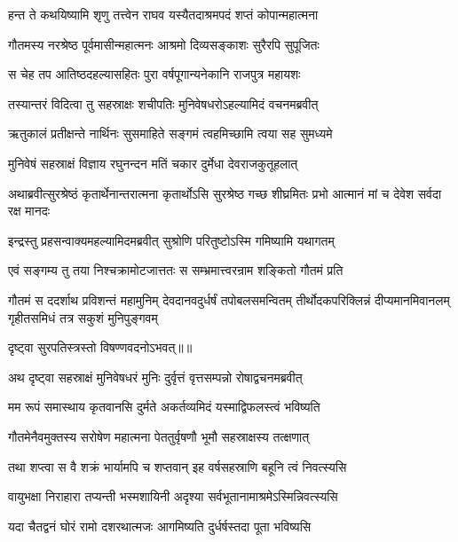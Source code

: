 \twolineshloka
{हन्त ते कथयिष्यामि शृणु तत्त्वेन राघव}
{यस्यैतदाश्रमपदं शप्तं कोपान्महात्मना} %

\twolineshloka
{गौतमस्य नरश्रेष्ठ पूर्वमासीन्महात्मनः}
{आश्रमो दिव्यसङ्काशः सुरैरपि सुपूजितः} %

\twolineshloka
{स चेह तप आतिष्ठदहल्यासहितः पुरा}
{वर्षपूगान्यनेकानि राजपुत्र महायशः} %

\twolineshloka
{तस्यान्तरं विदित्वा तु सहस्राक्षः शचीपतिः}
{मुनिवेषधरोऽहल्यामिदं वचनमब्रवीत्} %

\twolineshloka
{ऋतुकालं प्रतीक्षन्ते नार्थिनः सुसमाहिते}
{सङ्गमं त्वहमिच्छामि त्वया सह सुमध्यमे} %

\twolineshloka
{मुनिवेषं सहस्राक्षं विज्ञाय रघुनन्दन}
{मतिं चकार दुर्मेधा देवराजकुतूहलात्} %

\threelineshloka
{अथाब्रवीत्सुरश्रेष्ठं कृतार्थेनान्तरात्मना}
{कृतार्थोऽसि सुरश्रेष्ठ गच्छ शीघ्रमितः प्रभो}
{आत्मानं मां च देवेश सर्वदा रक्ष मानदः} %

\twolineshloka
{इन्द्रस्तु प्रहसन्वाक्यमहल्यामिदमब्रवीत्}
{सुश्रोणि परितुष्टोऽस्मि गमिष्यामि यथागतम्} %

\twolineshloka
{एवं सङ्गम्य तु तया निश्चक्रामोटजात्ततः}
{स सम्भ्रमात्त्वरन्राम शङ्कितो गौतमं प्रति} %

\fourlineshloka
{गौतमं स ददर्शाथ प्रविशन्तं महामुनिम्}
{देवदानवदुर्धर्षं तपोबलसमन्वितम्}
{तीर्थोदकपरिक्लिन्नं दीप्यमानमिवानलम्}
{गृहीतसमिधं तत्र सकुशं मुनिपुङ्गवम्} %

{दृष्ट्वा सुरपतिस्त्रस्तो विषण्णवदनोऽभवत्॥॥} %

\addtocounter{shlokacount}{1}

\twolineshloka
{अथ दृष्ट्वा सहस्राक्षं मुनिवेषधरं मुनिः}
{दुर्वृत्तं वृत्तसम्पन्नो रोषाद्वचनमब्रवीत्} %

\twolineshloka
{मम रूपं समास्थाय कृतवानसि दुर्मते}
{अकर्तव्यमिदं यस्माद्विफलस्त्वं भविष्यति} %

\twolineshloka
{गौतमेनैवमुक्तस्य सरोषेण महात्मना}
{पेततुर्वृषणौ भूमौ सहस्राक्षस्य तत्क्षणात्} %

\twolineshloka
{तथा शप्त्वा स वै शक्रं भार्यामपि च शप्तवान्}
{इह वर्षसहस्राणि बहूनि त्वं निवत्स्यसि} %

\twolineshloka
{वायुभक्षा निराहारा तप्यन्ती भस्मशायिनी}
{अदृश्या सर्वभूतानामाश्रमेऽस्मिन्निवत्स्यसि} %

\twolineshloka
{यदा चैतद्वनं घोरं रामो दशरथात्मजः}
{आगमिष्यति दुर्धर्षस्तदा पूता भविष्यसि} %

